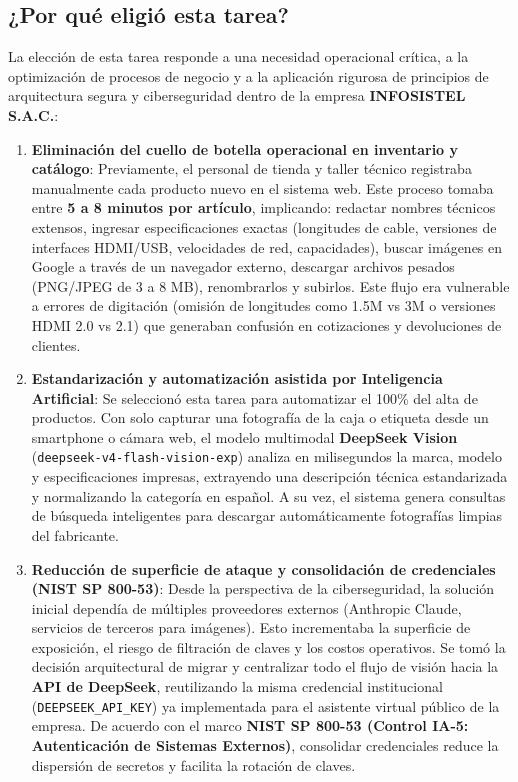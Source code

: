 \documentclass[11pt,a4paper]{article}
\begin{document}
\subsection{¿Por qué eligió esta tarea?}

La elección de esta tarea responde a una necesidad operacional crítica, a la optimización de procesos de negocio y a la aplicación rigurosa de principios de arquitectura segura y ciberseguridad dentro de la empresa \textbf{INFOSISTEL S.A.C.}:

\begin{enumerate}[label=\alph*)]
    \item \textbf{Eliminación del cuello de botella operacional en inventario y catálogo}:
    Previamente, el personal de tienda y taller técnico registraba manualmente cada producto nuevo en el sistema web. Este proceso tomaba entre \textbf{5 a 8 minutos por artículo}, implicando: redactar nombres técnicos extensos, ingresar especificaciones exactas (longitudes de cable, versiones de interfaces HDMI/USB, velocidades de red, capacidades), buscar imágenes en Google a través de un navegador externo, descargar archivos pesados (PNG/JPEG de 3 a 8 MB), renombrarlos y subirlos. Este flujo era vulnerable a errores de digitación (omisión de longitudes como 1.5M vs 3M o versiones HDMI 2.0 vs 2.1) que generaban confusión en cotizaciones y devoluciones de clientes.

    \item \textbf{Estandarización y automatización asistida por Inteligencia Artificial}:
    Se seleccionó esta tarea para automatizar el 100\% del alta de productos. Con solo capturar una fotografía de la caja o etiqueta desde un smartphone o cámara web, el modelo multimodal \textbf{DeepSeek Vision} (\texttt{deepseek-v4-flash-vision-exp}) analiza en milisegundos la marca, modelo y especificaciones impresas, extrayendo una descripción técnica estandarizada y normalizando la categoría en español. A su vez, el sistema genera consultas de búsqueda inteligentes para descargar automáticamente fotografías limpias del fabricante.

    \item \textbf{Reducción de superficie de ataque y consolidación de credenciales (NIST SP 800-53)}:
    Desde la perspectiva de la ciberseguridad, la solución inicial dependía de múltiples proveedores externos (Anthropic Claude, servicios de terceros para imágenes). Esto incrementaba la superficie de exposición, el riesgo de filtración de claves y los costos operativos. Se tomó la decisión arquitectural de migrar y centralizar todo el flujo de visión hacia la \textbf{API de DeepSeek}, reutilizando la misma credencial institucional (\texttt{DEEPSEEK\_API\_KEY}) ya implementada para el asistente virtual público de la empresa. De acuerdo con el marco \textbf{NIST SP 800-53 (Control IA-5: Autenticación de Sistemas Externos)}, consolidar credenciales reduce la dispersión de secretos y facilita la rotación de claves.


\end{enumerate}
\end{document}
